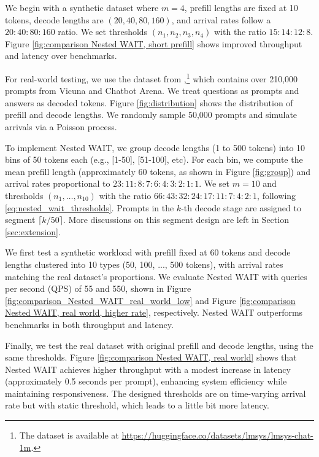 We begin with a synthetic dataset where \( m=4 \), prefill lengths are fixed at 10 tokens, decode lengths are \( (20, 40, 80, 160) \), and arrival rates follow a \( 20:40:80:160 \) ratio. We set thresholds \( (n_1, n_2, n_3, n_4) \) with the ratio \( 15:14:12:8 \). Figure \ref{fig:comparison Nested WAIT, short prefill} shows improved throughput and latency over benchmarks.

For real-world testing, we use the dataset from \cite{zheng2023lmsys},\footnote{The dataset is available at \url{https://huggingface.co/datasets/lmsys/lmsys-chat-1m}.} which contains over 210,000 prompts from Vicuna and Chatbot Arena. We treat questions as prompts and answers as decoded tokens. Figure \ref{fig:distribution} shows the distribution of prefill and decode lengths. We randomly sample 50,000 prompts and simulate arrivals via a Poisson process.

To implement Nested WAIT, we group decode lengths (1 to 500 tokens) into 10 bins of 50 tokens each (e.g., [1-50], [51-100], etc). For each bin, we compute the mean prefill length (approximately 60 tokens, as shown in Figure \ref{fig:group}) and arrival rates proportional to \( 23:11:8:7:6:4:3:2:1:1 \). We set \( m=10 \) and thresholds \( (n_1, \dots, n_{10}) \) with the ratio \( 66:43:32:24:17:11:7:4:2:1 \), following \eqref{eq:nested_wait_thresholds}. Prompts in the \( k \)-th decode stage are assigned to segment \( \lceil k/50 \rceil \). More discussions on this segment design are left in Section \ref{sec:extension}.

We first test a synthetic workload with prefill fixed at 60 tokens and decode lengths clustered into 10 types (50, 100, ..., 500 tokens), with arrival rates matching the real dataset's proportions. We evaluate Nested WAIT with queries per second (QPS) of 55 and 550, shown in Figure \ref{fig:comparison_Nested_WAIT_real_world_low} and Figure \ref{fig:comparison Nested WAIT, real world, higher rate}, respectively. Nested WAIT outperforms benchmarks in both throughput and latency.


Finally, we test the real dataset with original prefill and decode lengths, using the same thresholds. Figure \ref{fig:comparison Nested WAIT, real world} shows that Nested WAIT achieves higher throughput with a modest increase in latency (approximately 0.5 seconds per prompt), enhancing system efficiency while maintaining responsiveness. The designed thresholds are on time-varying arrival rate but with static threshold, which leads to a little bit more latency.

